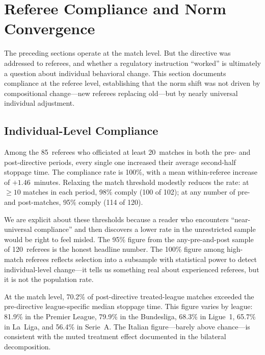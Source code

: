 
\section{Referee Compliance and Norm Convergence}
\label{sec:compliance}

The preceding sections operate at the match level. But the directive
was addressed to referees, and whether a regulatory instruction
``worked'' is ultimately a question about individual behavioral
change. This section documents compliance at the referee level,
establishing that the norm shift was not driven by compositional
change---new referees replacing old---but by nearly universal
individual adjustment.


\subsection{Individual-Level Compliance}
\label{subsec:compliance_rates}

Among the 85~referees who officiated at least 20~matches in both the
pre- and post-directive periods, every single one increased their
average second-half stoppage time. The compliance rate is 100\%, with
a mean within-referee increase of $+1.46$~minutes. Relaxing the match
threshold modestly reduces the rate: at $\geq 10$ matches in each
period, 98\% comply (100 of 102); at any number of pre- and
post-matches, 95\% comply (114 of 120).

We are explicit about these thresholds because a reader who encounters
``near-universal compliance'' and then discovers a lower rate in the
unrestricted sample would be right to feel misled. The 95\% figure
from the any-pre-and-post sample of 120~referees is the honest
headline number. The 100\% figure among high-match referees reflects
selection into a subsample with statistical power to detect
individual-level change---it tells us something real about experienced
referees, but it is not the population rate.

At the match level, 70.2\% of post-directive treated-league matches
exceeded the pre-directive league-specific median stoppage time. This
figure varies by league: 81.9\% in the Premier League, 79.9\% in the
Bundesliga, 68.3\% in Ligue~1, 65.7\% in La~Liga, and 56.4\% in
Serie~A. The Italian figure---barely above chance---is consistent with
the muted treatment effect documented in the bilateral decomposition.

